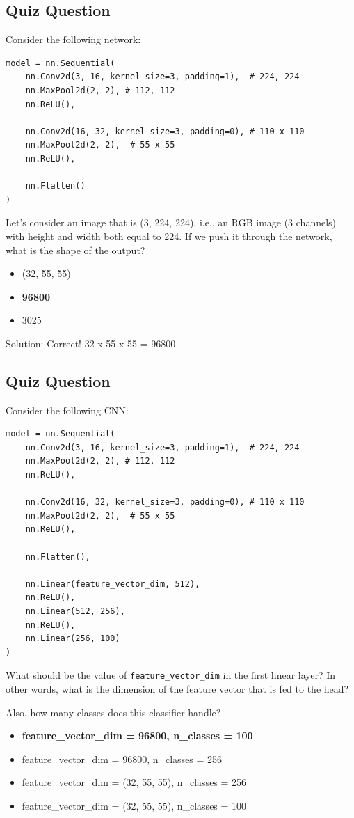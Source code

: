 \subsection{Quiz Question}

Consider the following network:
\begin{lstlisting}
model = nn.Sequential(
    nn.Conv2d(3, 16, kernel_size=3, padding=1),  # 224, 224
    nn.MaxPool2d(2, 2), # 112, 112
    nn.ReLU(),
    
    nn.Conv2d(16, 32, kernel_size=3, padding=0), # 110 x 110
    nn.MaxPool2d(2, 2),  # 55 x 55
    nn.ReLU(),
    
    nn.Flatten()
)
\end{lstlisting}
Let's consider an image that is (3, 224, 224), i.e., an RGB image (3 channels) with height and width both equal to 224. If we push it through the network, what is the shape of the output?
\begin{itemize}
    \item (32, 55, 55)
    \item \textbf{96800}
    \item 3025
\end{itemize}
Solution: Correct! 32 x 55 x 55 = 96800
\subsection{Quiz Question}

Consider the following CNN:
\begin{lstlisting}
model = nn.Sequential(
    nn.Conv2d(3, 16, kernel_size=3, padding=1),  # 224, 224
    nn.MaxPool2d(2, 2), # 112, 112
    nn.ReLU(),
    
    nn.Conv2d(16, 32, kernel_size=3, padding=0), # 110 x 110
    nn.MaxPool2d(2, 2),  # 55 x 55
    nn.ReLU(),
    
    nn.Flatten(),
    
    nn.Linear(feature_vector_dim, 512),
    nn.ReLU(),
    nn.Linear(512, 256),
    nn.ReLU(),
    nn.Linear(256, 100)
)
\end{lstlisting}
What should be the value of \lstinline{feature_vector_dim} in the first linear layer? In other words, what is the dimension of the feature vector that is fed to the head?

Also, how many classes does this classifier handle?
\begin{itemize}
    \item \textbf{feature\_vector\_dim = 96800, n\_classes = 100}
    \item feature\_vector\_dim = 96800, n\_classes = 256
    \item feature\_vector\_dim = (32, 55, 55), n\_classes = 256
    \item feature\_vector\_dim = (32, 55, 55), n\_classes = 100
\end{itemize}

